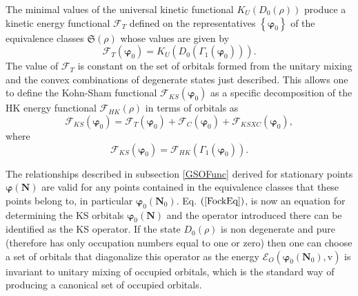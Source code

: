 \documentclass[aps,preprint]{revtex4}%
\begin{document}
The minimal values of the universal kinetic functional $K_{U}\left(
D_{0}\left(  \rho\right)  \right)  $ produce a kinetic energy functional
$\mathcal{F}_{T}$ defined on the representatives $\left\{  \boldsymbol{\varphi
}_{0}\right\}  $ of the equivalence classes $\mathfrak{S}\left(  \rho\right)
$ whose values are given by
\begin{equation}
\mathcal{F}_{T}\left(  \boldsymbol{\varphi}_{0}\right)  =K_{U}\left(
D_{0}\left(  \Gamma_{1}\left(  \boldsymbol{\varphi}_{0}\right)  \right)
\right)  . \label{KEFunc}%
\end{equation}
The value of $\mathcal{F}_{T}$ is constant on the set of orbitals formed from
the unitary mixing and the convex combinations of degenerate states just
described. This allows one to define the Kohn-Sham functional $\mathcal{F}%
_{KS}\left(  \boldsymbol{\varphi}_{0}\right)  $ as a specific decomposition of
the HK energy functional $\mathcal{F}_{HK}\left(  \rho\right)  $ in terms of
orbitals as
\begin{equation}
\mathcal{F}_{KS}\left(  \boldsymbol{\varphi}_{0}\right)  =\mathcal{F}%
_{T}\left(  \boldsymbol{\varphi}_{0}\right)  +\mathcal{F}_{C}\left(
\boldsymbol{\varphi}_{0}\right)  +\mathcal{F}_{KSXC}\left(
\boldsymbol{\varphi}_{0}\right)  ,
\end{equation}
where
\begin{equation}
\mathcal{F}_{KS}\left(  \boldsymbol{\varphi}_{0}\right)  =\mathcal{F}%
_{HK}\left(  \Gamma_{1}\left(  \boldsymbol{\varphi}_{0}\right)  \right)  .
\end{equation}


The relationships described in subsection \ref{GSOFunc} derived for stationary
points $\boldsymbol{\varphi}\left(  \boldsymbol{N}\right)  $ are valid for any
points contained in the equivalence classes that these points belong to, in
particular $\boldsymbol{\varphi}_{0}\left(  \boldsymbol{\boldsymbol{N}}%
_{0}\right)  $. Eq. $\left(  \ref{FockEq}\right)  $, is now an equation for
determining the KS orbitals $\boldsymbol{\varphi}_{0}\left(  \boldsymbol{N}%
\right)  $ and the operator introduced there can be identified as the KS
operator. If the state $D_{0}\left(  \rho\right)  $ is non degenerate and pure
(therefore has only occupation numbers equal to one or zero) then one can
choose a set of orbitals that diagonalize this operator as the energy
$\mathcal{E}_{O}\left(  \boldsymbol{\varphi}_{0}\left(  \boldsymbol{N}%
_{0}\right)  ,\mathrm{v}\right)  $ is invariant to unitary mixing of occupied
orbitals, which is the standard way of producing a canonical set of occupied orbitals.
\end{document}
